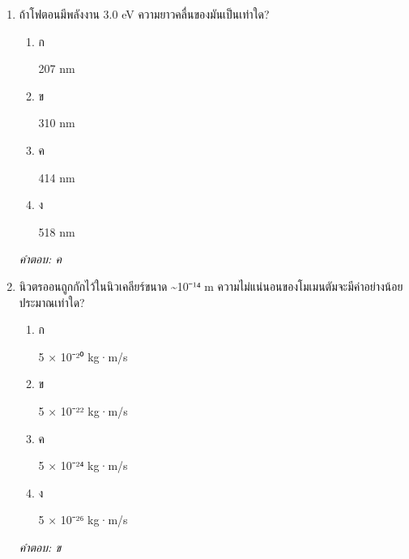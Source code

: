\documentclass[12pt]{article}
\begin{document}
\begin{enumerate}[label=\arabic*., itemsep=0.5\baselineskip, topsep=0.5\baselineskip, leftmargin=*]
\item ถ้าโฟตอนมีพลังงาน 3.0 eV ความยาวคลื่นของมันเป็นเท่าใด?
\begin{enumerate}[label=\alph*)., itemsep=0.3\baselineskip, topsep=0.3\baselineskip]
\item ก\ 
\begin{minipage}[t]{0.9\linewidth}
\raggedright 207 nm
\end{minipage}
\item ข\ 
\begin{minipage}[t]{0.9\linewidth}
\raggedright 310 nm
\end{minipage}
\item ค\ 
\begin{minipage}[t]{0.9\linewidth}
\raggedright 414 nm
\end{minipage}
\item ง\ 
\begin{minipage}[t]{0.9\linewidth}
\raggedright 518 nm
\end{minipage}
\end{enumerate}
\vspace{-0.3\baselineskip}
\begin{small}
\textit{คำตอบ: ค}
\end{small}

\item นิวตรออนถูกกักไว้ในนิวเคลียร์ขนาด \textasciitilde{}10⁻¹⁴ m ความไม่แน่นอนของโมเมนตัมจะมีค่าอย่างน้อยประมาณเท่าใด?
\begin{enumerate}[label=\alph*)., itemsep=0.3\baselineskip, topsep=0.3\baselineskip]
\item ก\ 
\begin{minipage}[t]{0.9\linewidth}
\raggedright 5 × 10⁻²⁰ kg·m/s
\end{minipage}
\item ข\ 
\begin{minipage}[t]{0.9\linewidth}
\raggedright 5 × 10⁻²² kg·m/s
\end{minipage}
\item ค\ 
\begin{minipage}[t]{0.9\linewidth}
\raggedright 5 × 10⁻²⁴ kg·m/s
\end{minipage}
\item ง\ 
\begin{minipage}[t]{0.9\linewidth}
\raggedright 5 × 10⁻²⁶ kg·m/s
\end{minipage}
\end{enumerate}
\vspace{-0.3\baselineskip}
\begin{small}
\textit{คำตอบ: ข}
\end{small}


\end{enumerate}
\end{document}
